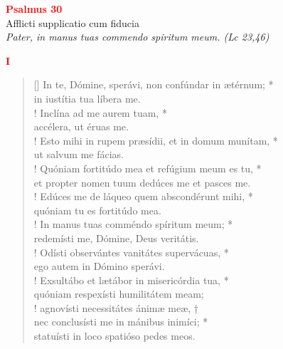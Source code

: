 


\def\greinitialformat#1{%
{\fontsize{39}{39}\selectfont #1}%
}




\vspace{0.3cm}
\begin{center}
 \textcolor{red}{\large \bf Psalmus 30}\\
Afflicti supplicatio cum fiducia\\
\textit{\small Pater, in manus tuas commendo spiritum meum. (Lc 23,46)}
\end{center}
\begin{center}
\textcolor{red}{\bf I}
\end{center}
\begin{verse}[\versewidth]
In te, Dómine, sperávi, non confúndar in ætérnum; *\\
in iustítia tua líbera me.\\!
\vin Inclína ad me aurem tuam, *\\
\vin accélera, ut éruas me.\\!
Esto mihi in rupem præsídii, et in domum munítam, *\\
ut salvum me fácias.\\!
\vin Quóniam fortitúdo mea et refúgium meum es tu, *\\
\vin et propter nomen tuum dedúces me et pasces me.\\!
Edúces me de láqueo quem abscondérunt mihi, *\\
quóniam tu es fortitúdo mea.\\!
\vin In manus tuas comméndo spíritum meum; *\\
\vin redemísti me, Dómine, Deus veritátis.\\!
Odísti observántes vanitátes supervácuas, *\\
ego autem in Dómino sperávi.\\!
\vin Exsultábo et lætábor in misericórdia tua, *\\
\vin quóniam respexísti humilitátem meam;\\!
agnovísti necessitátes ánimæ meæ, †\\
nec conclusísti me in mánibus inimíci; *\\
statuísti in loco spatióso pedes meos.\\
\end{verse}
